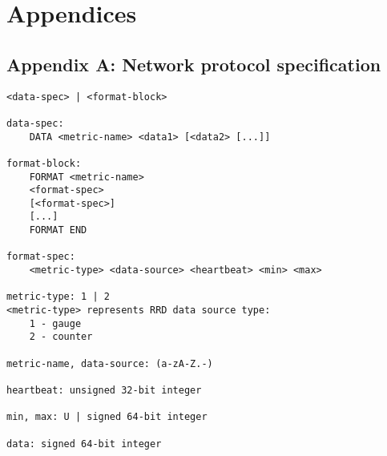 \section{Appendices}
    
    \subsection{Appendix A: Network protocol specification}\label{apd:network}
        \begin{verbatim}
<data-spec> | <format-block>
                
data-spec:
    DATA <metric-name> <data1> [<data2> [...]]
                    
format-block:
    FORMAT <metric-name>
    <format-spec>
    [<format-spec>]
    [...]
    FORMAT END
                        
format-spec:
    <metric-type> <data-source> <heartbeat> <min> <max>
                        
metric-type: 1 | 2
<metric-type> represents RRD data source type:
    1 - gauge
    2 - counter
                        
metric-name, data-source: (a-zA-Z.-)
                    
heartbeat: unsigned 32-bit integer

min, max: U | signed 64-bit integer

data: signed 64-bit integer
        \end{verbatim}

